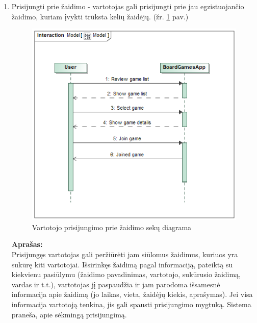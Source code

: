 \documentclass{VUMIFPSkursinis}
\begin{document}
			\begin{enumerate}
			\item Prisijungti prie žaidimo - vartotojas gali prisijungti prie 
				jau egzistuojančio žaidimo, kuriam įvykti trūksta kelių žaidėjų. (žr. \ref{img:JoinGameSequence} pav.)
				\begin{figure}[H]
					\centering
					\includegraphics[scale=0.5]{img/JoinGameSequence}
					\caption{Vartotojo prisijungimo prie žaidimo sekų diagrama}
					\label{img:JoinGameSequence}
				\end{figure}
				\textbf{Aprašas:}\\
					Prisijungęs vartotojas gali peržiūrėti jam siūlomus žaidimus, 
					kuriuos yra sukūrę kiti vartotojai. Išsirinkęs žaidimą pagal 
					informaciją, pateiktą su kiekvienu pasiūlymu (žaidimo pavadinimas, 
					vartotojo, sukūrusio žaidimą, vardas ir t.t.), vartotojas jį 
					paspaudžia ir jam parodoma išsamesnė informacija apie žaidimą 
					(jo laikas, vieta, žaidėjų kiekis, aprašymas). Jei visa informacija 
					vartotoją tenkina, jis gali spausti prisijungimo mygtuką. Sistema 
					praneša, apie sėkmingą prisijungimą.
				

\end{enumerate}
\end{document}
